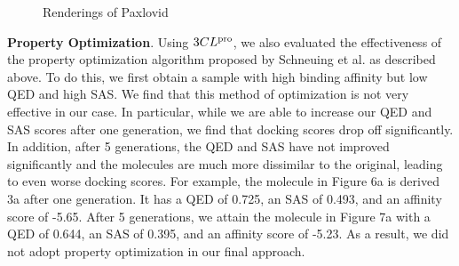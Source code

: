 \documentclass[11pt]{article}
\begin{document}
\begin{figure}[H]
    \centering
    \caption{Renderings of Paxlovid}
    \label{fig:mainc}
\end{figure}


\textbf{Property Optimization}. 
Using $3CL\textsuperscript{pro}$, we also evaluated the effectiveness of the 
property optimization algorithm proposed by Schneuing et al. \cite{schneuing2023}
as described above.
To do this, we first obtain a sample with high binding affinity but low 
QED and high SAS. We find that this method of optimization is not 
very effective in our case. In particular, while we are able to increase our 
QED and SAS scores after one generation, we find that docking scores drop off 
significantly. In addition, after 5 generations, the QED and SAS have not improved 
significantly and the molecules are much more dissimilar to the original, leading to 
even worse docking scores. For example, the molecule in Figure 6a is derived 3a 
after one generation. It has a QED of 0.725, an SAS of 0.493, and an affinity score of -5.65. 
After 5 generations, we attain the molecule in Figure 7a with a QED of 0.644, an SAS of 0.395,
and an affinity score of -5.23. As a result, we did not adopt property optimization in our 
final approach.
\end{document}
